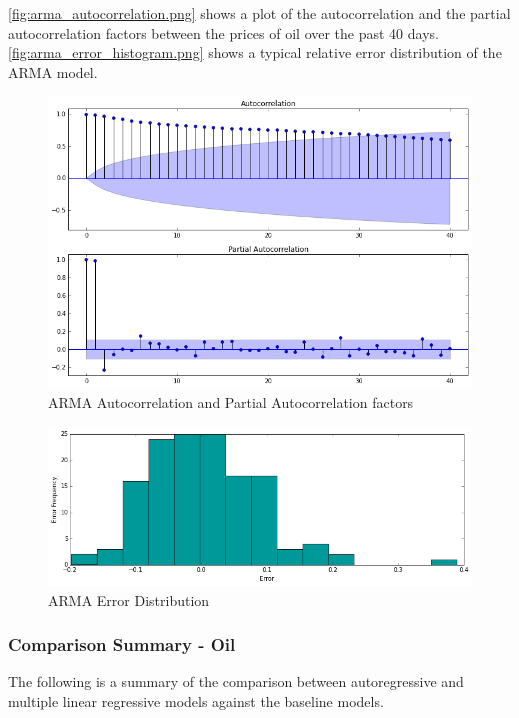 \documentclass[runningheads]{llncs}
\begin{document}
\noindent \autoref{fig:arma_autocorrelation.png} shows a plot of the autocorrelation and the partial autocorrelation factors between the prices of oil over the past 40 days. \\

\noindent \autoref{fig:arma_error_histogram.png} shows a typical relative error distribution of the ARMA model.

\begin{center}
\begin{figure}
\centering
\includegraphics[width=\textwidth]{arma_autocorrelation.png}
\caption{ARMA Autocorrelation and Partial Autocorrelation factors}
\label{fig:arma_autocorrelation.png}
\end{figure}
\end{center}

\begin{figure}
\centering
\includegraphics[width=\textwidth]{arma_error_histogram.png}
\caption{ARMA Error Distribution}
\label{fig:arma_error_histogram.png}
\end{figure}

\newpage
\subsubsection {Comparison Summary - Oil} The following is a summary of the comparison between autoregressive and multiple linear regressive models against the baseline models. \\
\end{document}
